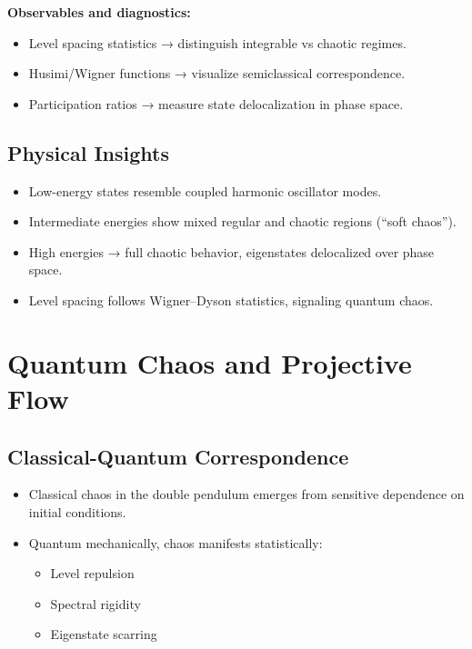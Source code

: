 \documentclass[11pt]{book}
\begin{document}
\textbf{Observables and diagnostics:}  
\begin{itemize}
   \item
 Level spacing statistics → distinguish integrable vs chaotic regimes.  
   \item
 Husimi/Wigner functions → visualize semiclassical correspondence.  
   \item
 Participation ratios → measure state delocalization in phase space.
\end{itemize}

\section{Physical Insights}
\begin{itemize}
   \item
 Low-energy states resemble coupled harmonic oscillator modes.  
   \item
 Intermediate energies show mixed regular and chaotic regions (“soft chaos”).  
   \item
 High energies → full chaotic behavior, eigenstates delocalized over phase space.  
   \item
 Level spacing follows Wigner–Dyson statistics, signaling quantum chaos.
\end{itemize}


\chapter{Quantum Chaos and Projective Flow}

\section{Classical-Quantum Correspondence}
\begin{itemize}
   \item
 Classical chaos in the double pendulum emerges from sensitive dependence on initial conditions.  
   \item
 Quantum mechanically, chaos manifests statistically:
 \begin{itemize}
    \item
     Level repulsion  
    \item
     Spectral rigidity  
    \item
     Eigenstate scarring
 \end{itemize}
\end{itemize}
\end{document}
